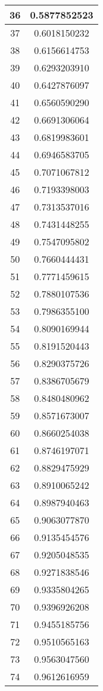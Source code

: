 \documentclass[12pt]{article}
\begin{document}
\begin{tabular}{||c|c||}
 36 & 0.5877852523 \\\hline
 37 & 0.6018150232 \\\hline
 38 &
0.6156614753 \\\hline
 39 & 0.6293203910 \\\hline
 40 & 0.6427876097 \\\hline
 41 & 0.6560590290
\\\hline
 42 &
   0.6691306064 \\\hline
 43 & 0.6819983601 \\\hline
 44 & 0.6946583705 \\\hline
 45 &
0.7071067812 \\\hline
 46 & 0.7193398003 \\\hline
 47 & 0.7313537016 \\\hline
 48 & 0.7431448255
\\\hline
 49 &
   0.7547095802 \\\hline
 50 & 0.7660444431 \\\hline
 51 & 0.7771459615 \\\hline
 52 &
0.7880107536 \\\hline
 53 & 0.7986355100 \\\hline
 54 & 0.8090169944 \\\hline
 55 & 0.8191520443
\\\hline
 56 &
   0.8290375726 \\\hline
 57 & 0.8386705679 \\\hline
 58 & 0.8480480962 \\\hline
 59 &
0.8571673007 \\\hline
 60 & 0.8660254038 \\\hline
 61 & 0.8746197071 \\\hline
 62 & 0.8829475929
\\\hline
 63 &
   0.8910065242 \\\hline
 64 & 0.8987940463 \\\hline
 65 & 0.9063077870 \\\hline
 66 &
0.9135454576 \\\hline
 67 & 0.9205048535 \\\hline
 68 & 0.9271838546 \\\hline
 69 & 0.9335804265
\\\hline
 70 &
   0.9396926208 \\\hline
 71 & 0.9455185756 \\\hline
 72 & 0.9510565163 \\\hline
 73 &
0.9563047560 \\\hline
 74 & 0.9612616959 \\\hline

\end{tabular}
\end{document}
